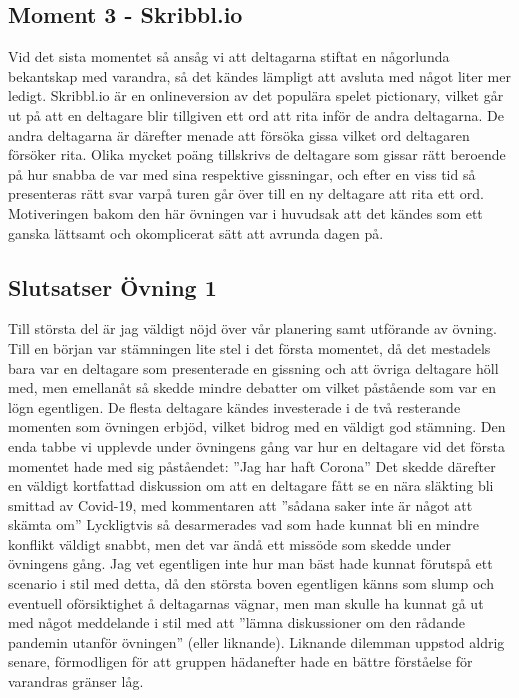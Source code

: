 \documentclass[a4paper, titlepage,12pt]{article}
\begin{document}
		\subsection{Moment 3 - Skribbl.io}
			Vid det sista momentet så ansåg vi att deltagarna stiftat en någorlunda bekantskap med varandra, så det kändes lämpligt att avsluta med något liter mer ledigt. Skribbl.io är en onlineversion av det populära spelet pictionary, vilket går ut på att en deltagare blir tillgiven ett ord att rita inför de andra deltagarna. De andra deltagarna är därefter menade att försöka gissa vilket ord deltagaren försöker rita. Olika mycket poäng tillskrivs de deltagare som gissar rätt beroende på hur snabba de var med sina respektive gissningar, och efter en viss tid så presenteras rätt svar varpå turen går över till en ny deltagare att rita ett ord.\cite{skribbl}\\

			Motiveringen bakom den här övningen var i huvudsak att det kändes som ett ganska lättsamt och okomplicerat sätt att avrunda dagen på.

		\subsection{Slutsatser Övning 1}
			Till största del är jag väldigt nöjd över vår planering samt utförande av övning. Till en början var stämningen lite stel i det första momentet, då det mestadels bara var en deltagare som presenterade en gissning och att övriga deltagare höll med, men emellanåt så skedde mindre debatter om vilket påstående som var en lögn egentligen. De flesta deltagare kändes investerade i de två resterande momenten som övningen erbjöd, vilket bidrog med en väldigt god stämning. Den enda tabbe vi upplevde under övningens gång var hur en deltagare vid det första momentet hade med sig påståendet: ''Jag har haft Corona'' Det skedde därefter en väldigt kortfattad diskussion om att en deltagare fått se en nära släkting bli smittad av Covid-19, med kommentaren att ''sådana saker inte är något att skämta om'' Lyckligtvis så desarmerades vad som hade kunnat bli en mindre konflikt väldigt snabbt, men det var ändå ett missöde som skedde under övningens gång. Jag vet egentligen inte hur man bäst hade kunnat förutspå ett scenario i stil med detta, då den största boven egentligen känns som slump och eventuell oförsiktighet å deltagarnas vägnar, men man skulle ha kunnat gå ut med något meddelande i stil med att ''lämna diskussioner om den rådande pandemin utanför övningen'' (eller liknande). Liknande dilemman uppstod aldrig senare, förmodligen för att gruppen hädanefter hade en bättre förståelse för varandras gränser låg.
\end{document}

